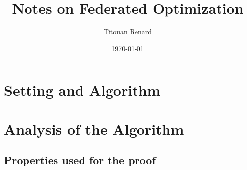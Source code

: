 \documentclass[11pt,hidelinks]{article}
\title{Notes on Federated Optimization}
\date{\today}
\author{Titouan Renard}
\begin{document}
\maketitle	
\tableofcontents

\section{Setting and Algorithm}

\newpage

\section{Analysis of the Algorithm}

\newpage
\subsection{Properties used for the proof}

\newpage
\end{document}
